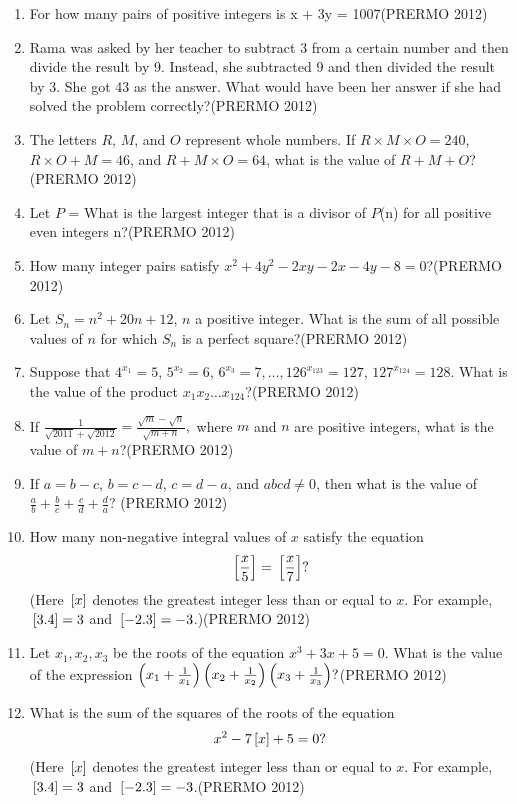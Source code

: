 \begin{enumerate}
\item For how many pairs of positive integers  is x + 3y = 1007\hfill(PRERMO 2012)
\item Rama was asked by her teacher to subtract 3 from a certain number and then divide the result by 9. Instead, she subtracted 9 and then divided the result by 3. She got 43 as the answer. What would have been her answer if she had solved the problem correctly?\hfill(PRERMO 2012)
\item The letters $R$, $M$, and $O$ represent whole numbers. If $R \times M \times O = 240$, $R \times O + M = 46$, and $R + M \times O = 64$, what is the value of $R + M + O$?\hfill(PRERMO 2012)
\item Let $P$ =  What is the largest integer that is a divisor of $P$(n) for all positive even integers n?\hfill(PRERMO 2012)
\item How many integer pairs  satisfy $ x ^ 2 + 4y ^ 2 - 2xy - 2x - 4y - 8 =0 $?\hfill(PRERMO 2012)
\item Let $S_n = n^2 + 20n + 12$, $n$ a positive integer. What is the sum of all possible values of $n$ for which $S_n$ is a perfect square?\hfill(PRERMO 2012)
\item Suppose that $4^{x_1} = 5$, $5^{x_2} = 6$, $6^{x_3} = 7, \ldots, 126^{x_{123}} = 127$, $127^{x_{124}} = 128$. What is the value of the product $x_1 x_2 \ldots x_{124}$?\hfill(PRERMO 2012)
\item If
	$\frac{1}{\sqrt{2011} + \sqrt{2012}} = \frac{\sqrt{m} - \sqrt{n}}{\sqrt{m+n}},$
where $m$ and $n$ are positive integers, what is the value of $m + n$?\hfill(PRERMO 2012)
\item If $a = b - c$, $b = c - d$, $c = d - a$, and $abcd \neq 0$, then what is the value of $\frac{a}{b} + \frac{b}{c} + \frac{c}{d} + \frac{d}{a}$? \hfill(PRERMO 2012)
\item How many non-negative integral values of $x$ satisfy the equation
	\begin{align}
    {}\left[\frac{x}{5}\right] = {}\left[\frac{x}{7}\right]?
	\end{align}
    (Here ${}\left[x\right]$ denotes the greatest integer less than or equal to $x$. For example, ${}\left[3.4\right] = 3$ and ${}\left[-2.3\right] = -3$.)\hfill(PRERMO 2012)
\item Let $x_1, x_2, x_3$ be the roots of the equation $x^3 + 3x + 5 = 0$. What is the value of the expression $ \left( x_1 + \frac{1}{x_1} \right) \left( x_2 + \frac{1}{x_2} \right)\left( x_3 + \frac{1}{x_3}\right)? $\hfill(PRERMO 2012)
\item What is the sum of the squares of the roots of the equation
	\begin{align}
	x^2 - 7{}\left[x\right] + 5 = 0?
\end{align}
(Here ${}\left[x\right]$ denotes the greatest integer less than or equal to $x$. For example, ${}\left[3.4\right] = 3$ and ${}\left[ -2.3\right] = -3$.\hfill(PRERMO 2012)
\end{enumerate}
